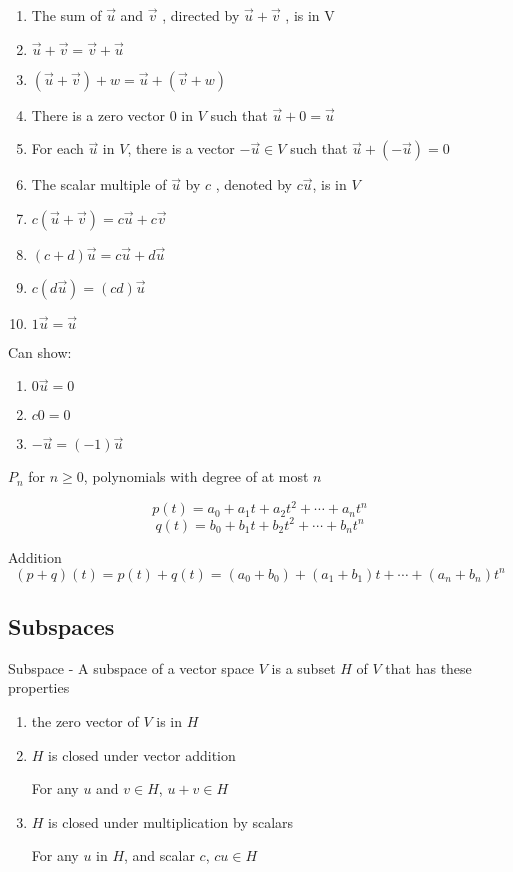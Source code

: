\begin{enumerate}
	\item The sum of $ \vec{u} $  and $ \vec{v} $ , directed by $ \vec{u}+\vec{v} $ , is in V
	\item $\vec{u}+\vec{v}=\vec{v}+\vec{u}$
	\item $(\vec{u}+\vec{v})+w = \vec{u} + (\vec{v}+w)$
	\item There is a zero vector $0$ in $V$ such that $\vec{u}+0=\vec{u}$
	\item For each $\vec{u}$ in $V$, there is a vector $-\vec{u}\in V$ such that $\vec{u}+(-\vec{u})=0$
	\item The scalar multiple of $ \vec{u} $  by $ c $ , denoted by $c\vec{u}$, is in $ V $ 
	\item $c(\vec{u}+\vec{v})=c\vec{u}+c\vec{v}$
	\item $(c+d)\vec{u}=c\vec{u}+d\vec{u}$
	\item $c(d\vec{u})=(cd)\vec{u}$
	\item $1\vec{u}=\vec{u}$
\end{enumerate}

\hfill

Can show:
\begin{enumerate}
  \item $0\vec{u}=0$
	\item $c0=0$
  \item $-\vec{u}=(-1)\vec{u}$
\end{enumerate}


$P_{n}$ for $n\ge 0$, polynomials with degree of at most $n$

\[	
	p(t) = a_{0}+a_{1}t+a_{2}t^{2}+\cdots + a_{n}t^{n}
\]
\[
	\label{}	
	q(t) = b_{0}+b_{1}t+b_{2}t^{2}+\cdots + b_{n}t^{n}
\]

Addition
\[
	(p+q)(t)=p(t)+q(t)= (a_{0}+b_{0})+(a_{1}+b_{1})t+\cdots +(a_{n}+b_{n})t^{n}
\]

\subsection{Subspaces}
 Subspace - A subspace of a vector space $V$ is a subset $H$ of $V$ that has these properties
 
 \begin{enumerate}
	 \item the zero vector of $V$ is in $H$
	\item $H$ is closed under vector addition

		For any $u$ and $v\in H$, $u+v\in H$
	\item $H$ is closed under multiplication by scalars 

	 	For any $u$ in $H$, and scalar $c$, $cu \in H$
 \end{enumerate}



